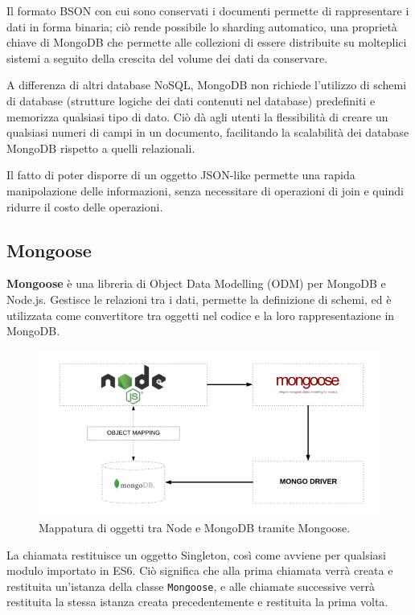 Il formato BSON con cui sono conservati i documenti permette di rappresentare i dati in forma binaria; ciò rende possibile lo sharding automatico, una proprietà chiave di MongoDB che permette alle collezioni di essere distribuite su molteplici sistemi a seguito della crescita del volume dei dati da conservare.

A differenza di altri database NoSQL, MongoDB non richiede l'utilizzo di schemi di database (strutture logiche dei dati contenuti nel database) predefiniti e memorizza qualsiasi tipo di dato. Ciò dà agli utenti la flessibilità di creare un qualsiasi numeri di campi in un documento, facilitando la scalabilità dei database MongoDB rispetto a quelli relazionali. 

Il fatto di poter disporre di un oggetto JSON-like permette una rapida manipolazione delle informazioni, senza necessitare di operazioni di join e quindi ridurre il costo delle operazioni.\cite{searchdatamanagement}

\subsection{Mongoose}
\textbf{Mongoose} è una libreria di Object Data Modelling (ODM) per MongoDB e Node.js. Gestisce le relazioni tra i dati, permette la definizione di schemi, ed è utilizzata come convertitore tra oggetti nel codice e la loro rappresentazione in MongoDB.

\begin{figure}[h]
  \includegraphics[width=\linewidth]{res/Mongoose.png}
  \caption[Mappatura di oggetti tra Node e MongoDB tramite Mongoose.]{Mappatura di oggetti tra Node e MongoDB tramite Mongoose.\protect\cite{freecodecamp}}
  \label{fig:Mongoose}
\end{figure}

La chiamata  restituisce un oggetto Singleton, così come avviene per qualsiasi modulo importato in ES6. Ciò significa che alla prima chiamata verrà creata e restituita un'istanza della classe \texttt{Mongoose}, e alle chiamate successive verrà restituita la stessa istanza creata precedentemente e restituita la prima volta.\cite{freecodecamp}

